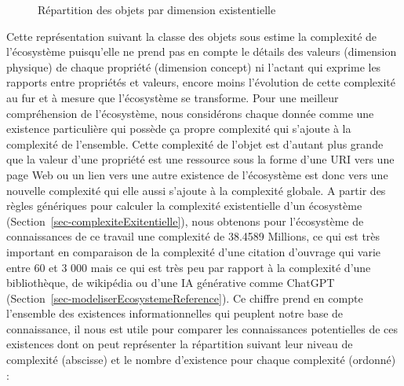 \documentclass[
  a4paper,
  DIV=11,
  numbers=noendperiod]{scrreprt}
\begin{document}
\begin{figure}


\caption{\label{fig-repartitionDimExi}Répartition des objets par
dimension existentielle}

\end{figure}%

Cette représentation suivant la classe des objets sous estime la
complexité de l'écosystème puisqu'elle ne prend pas en compte le détails
des valeurs (dimension physique) de chaque propriété (dimension concept)
ni l'actant qui exprime les rapports entre propriétés et valeurs, encore
moins l'évolution de cette complexité au fur et à mesure que
l'écosystème se transforme. Pour une meilleur compréhension de
l'écosystème, nous considérons chaque donnée comme une existence
particulière qui possède ça propre complexité qui s'ajoute à la
complexité de l'ensemble. Cette complexité de l'objet est d'autant plus
grande que la valeur d'une propriété est une ressource sous la forme
d'une URI vers une page Web ou un lien vers une autre existence de
l'écosystème est donc vers une nouvelle complexité qui elle aussi
s'ajoute à la complexité globale. A partir des règles génériques pour
calculer la complexité existentielle d'un écosystème
(Section~\ref{sec-complexiteExitentielle}), nous obtenons pour
l'écosystème de connaissances de ce travail une complexité de 38.4589
Millions, ce qui est très important en comparaison de la complexité
d'une citation d'ouvrage qui varie entre 60 et 3 000 mais ce qui est
très peu par rapport à la complexité d'une bibliothèque, de wikipédia ou
d'une IA générative comme ChatGPT
(Section~\ref{sec-modeliserEcosystemeReference}). Ce chiffre prend en
compte l'ensemble des existences informationnelles qui peuplent notre
base de connaissance, il nous est utile pour comparer les connaissances
potentielles de ces existences dont on peut représenter la répartition
suivant leur niveau de complexité (abscisse) et le nombre d'existence
pour chaque complexité (ordonné) :
\end{document}
